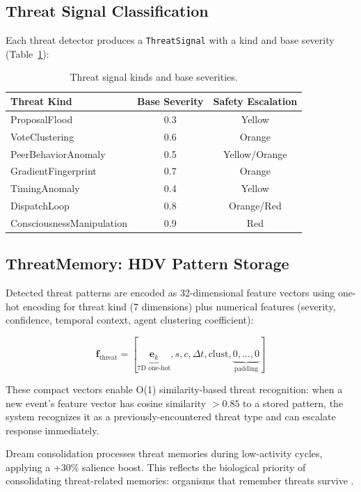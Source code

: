 \documentclass[11pt,a4paper]{article}
\begin{document}
\subsection{Threat Signal Classification}

Each threat detector produces a \texttt{ThreatSignal} with a kind and base severity (Table~\ref{tab:threat_severity}):

\begin{table}[h]
\centering
\caption{Threat signal kinds and base severities.}
\label{tab:threat_severity}
\begin{tabular}{lcc}
\toprule
\textbf{Threat Kind} & \textbf{Base Severity} & \textbf{Safety Escalation} \\
\midrule
ProposalFlood & 0.3 & Yellow \\
VoteClustering & 0.6 & Orange \\
PeerBehaviorAnomaly & 0.5 & Yellow/Orange \\
GradientFingerprint & 0.7 & Orange \\
TimingAnomaly & 0.4 & Yellow \\
DispatchLoop & 0.8 & Orange/Red \\
ConsciousnessManipulation & 0.9 & Red \\
\bottomrule
\end{tabular}
\end{table}

\subsection{ThreatMemory: HDV Pattern Storage}

Detected threat patterns are encoded as 32-dimensional feature vectors using one-hot encoding for threat kind (7 dimensions) plus numerical features (severity, confidence, temporal context, agent clustering coefficient):

\begin{equation}
\mathbf{f}_{\text{threat}} = [\underbrace{\mathbf{e}_k}_{\text{7D one-hot}}, s, c, \Delta t, \text{clust}, \underbrace{0, \ldots, 0}_{\text{padding}}]
\end{equation}

These compact vectors enable O(1) similarity-based threat recognition: when a new event's feature vector has cosine similarity $> 0.85$ to a stored pattern, the system recognizes it as a previously-encountered threat type and can escalate response immediately.

Dream consolidation processes threat memories during low-activity cycles, applying a +30\% salience boost. This reflects the biological priority of consolidating threat-related memories: organisms that remember threats survive \citep{walker2017}.
\end{document}
